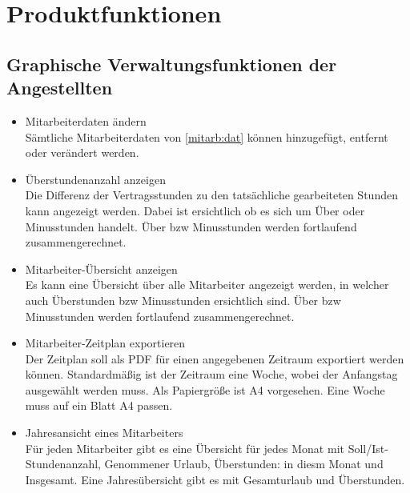 \section{Produktfunktionen}

\subsection{Graphische Verwaltungsfunktionen der Angestellten}
\begin{itemize}[leftmargin=1.0in]
    \item [\lf] Mitarbeiterdaten ändern\\
        Sämtliche Mitarbeiterdaten von \ref{mitarb:dat} können hinzugefügt, entfernt oder verändert werden.
    \item [\lf] Überstundenanzahl anzeigen\\
        Die Differenz der Vertragsstunden zu den tatsächliche gearbeiteten Stunden kann angezeigt werden. Dabei ist ersichtlich ob es sich um Über oder Minusstunden handelt. Über bzw Minusstunden werden fortlaufend zusammengerechnet.
    \item [\lf] Mitarbeiter-Übersicht anzeigen\\
        Es kann eine Übersicht über alle Mitarbeiter angezeigt werden, in welcher auch Überstunden bzw Minusstunden ersichtlich sind. Über bzw Minusstunden werden fortlaufend zusammengerechnet.
    \item [\lf] Mitarbeiter-Zeitplan exportieren\\
        Der Zeitplan soll als PDF für einen angegebenen Zeitraum exportiert werden können. Standardmäßig ist der Zeitraum eine Woche, wobei der Anfangstag ausgewählt werden muss. Als Papiergröße ist A4 vorgesehen. Eine Woche muss auf ein Blatt A4 passen.
    \item [\lf] Jahresansicht eines Mitarbeiters\\
        Für jeden Mitarbeiter gibt es eine Übersicht für jedes Monat mit Soll/Ist-Stundenanzahl, Genommener Urlaub, Überstunden: in diesm Monat und Insgesamt. Eine Jahresübersicht gibt es mit Gesamturlaub und Überstunden.
\end{itemize}
    \lfn

